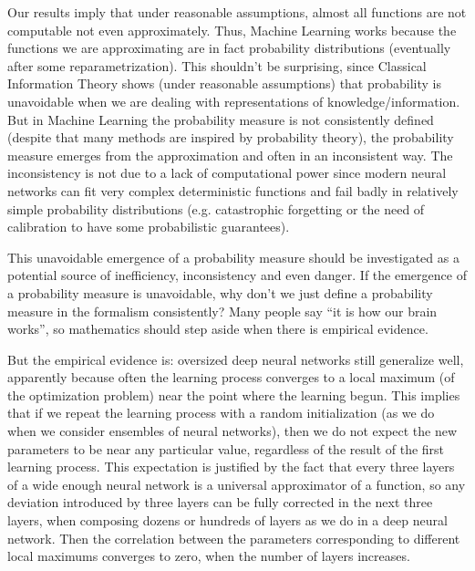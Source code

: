 \documentclass[11pt]{book}
\begin{document}
Our results imply that under reasonable assumptions, almost all
functions are not computable not even approximately. Thus, Machine
Learning works because the functions we are approximating are in fact
probability distributions (eventually after some
reparametrization\cite{anonymous2023value-probability}). This shouldn't be surprising, since Classical Information
Theory shows (under reasonable assumptions) that probability is
unavoidable when we are dealing with representations of
knowledge/information\cite{novak2008tractability}\cite{hennig2022probabilistic}. But in Machine Learning the probability measure is
not consistently defined (despite that many methods are inspired by
probability theory), the probability measure emerges from the
approximation\cite{anonymous2023value-probability} and often in an inconsistent way. The inconsistency is not due to
a lack of computational power since modern neural networks can fit very
complex deterministic functions and fail
badly\cite{lakshminarayanan2017simple}\cite{degrancey:hal-03769683} in relatively simple probability distributions (e.g. catastrophic
forgetting or the need of calibration to have some probabilistic
guarantees\cite{degrancey:hal-03769683}).

This unavoidable emergence of a probability measure should be
investigated as a potential source of inefficiency, inconsistency and
even danger. If the emergence of a probability measure is unavoidable,
why don't we just define a probability measure in the formalism
consistently? Many people say ``it is how our brain works'', so
mathematics should step aside when there is empirical evidence.

But the empirical evidence is: oversized deep neural networks still
generalize well, apparently because often the learning process converges
to a local maximum (of the optimization problem) near the point where
the learning begun\cite{li2018learning}. This implies that if we repeat the learning process with a
random initialization (as we do when we consider ensembles of neural
networks\cite{lakshminarayanan2017simple}\cite{egele2022autodeuq}),
then we do not expect the new parameters to be near any particular
value, regardless of the result of the first learning process. This
expectation is justified by the fact that every three layers of a wide
enough neural network is a universal approximator of a
function\cite{hornik1989multilayer}, so any deviation introduced by three
layers can be fully corrected in the next three layers, when composing
dozens or hundreds of layers as we do in a deep neural network. Then the
correlation between the parameters corresponding to different local
maximums converges to zero, when the number of layers increases.
\end{document}
